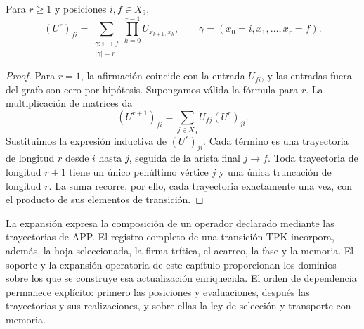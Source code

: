 \begin{teorema}
\label{geo:thm-expansion}
Para $r\geq1$ y posiciones $i,f\in X_9$,
\[
 (U^r)_{fi}
 =\sum_{\substack{\gamma:i\to f\\|\gamma|=r}}
   \prod_{k=0}^{r-1}U_{x_{k+1},x_k},
 \qquad\gamma=(x_0=i,x_1,\ldots,x_r=f).
\]
\end{teorema}

\begin{proof}
Para $r=1$, la afirmación coincide con la entrada $U_{fi}$, y las entradas fuera del grafo son cero por hipótesis. Supongamos válida la fórmula para $r$. La multiplicación de matrices da
\[
 (U^{r+1})_{fi}=\sum_{j\in X_9}U_{fj}(U^r)_{ji}.
\]
Sustituimos la expresión inductiva de $(U^r)_{ji}$. Cada término es una trayectoria de longitud $r$ desde $i$ hasta $j$, seguida de la arista final $j\to f$. Toda trayectoria de longitud $r+1$ tiene un único penúltimo vértice $j$ y una única truncación de longitud $r$. La suma recorre, por ello, cada trayectoria exactamente una vez, con el producto de sus elementos de transición.
\end{proof}

La expansión expresa la composición de un operador declarado mediante las trayectorias de APP. El registro completo de una transición TPK incorpora, además, la hoja seleccionada, la firma trítica, el acarreo, la fase y la memoria. El soporte y la expansión operatoria de este capítulo proporcionan los dominios sobre los que se construye esa actualización enriquecida. El orden de dependencia permanece explícito: primero las posiciones y evaluaciones, después las trayectorias y sus realizaciones, y sobre ellas la ley de selección y transporte con memoria.
